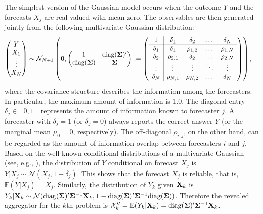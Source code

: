 \documentclass[11pt]{article}
\newcommand{\E}{\mathbb{E}}
\theoremstyle{definition}
\theoremstyle{definition}
\def\bSigma{{\bf \Sigma}}
\def\X{{\bf X}}
\def\E{{\mathbb E}}
\def\diag{\text{diag}}
\def\diag{\text{diag}}
\begin{document}
The simplest version of the Gaussian model occurs when the outcome $Y$ and the forecasts $X_j$ are real-valued with mean zero. The observables are then generated jointly from the following multivariate Gaussian distribution:
\begin{align}
\left(\begin{matrix} Y \\ X_{1}\\ \vdots \\ X_{N} \end{matrix}\right) &\sim \mathcal{N}_{N+1}\left( 
 \boldsymbol{0}, \left(\begin{matrix} 
1 & \diag(\bSigma)'\\
\diag(\bSigma) &\bSigma\\
 \end{matrix}\right) 
 :=
 \left(\begin{array}{c | c c cc }
1 & \delta_1 & \delta_2 & \dots & \delta_N  \\ \hline
\delta_1 & \delta_1 &\rho_{1,2} & \dots & \rho_{1,N}   \\ 
\delta_2 & \rho_{2,1} & \delta_2 & \dots & \rho_{2,N}  \\ 
\vdots & \vdots & \vdots & \ddots & \vdots  \\ 
\delta_N & \rho_{N,1} & \rho_{N,2} & \dots & \delta_N\\ 
 \end{array}\right)\right),  \label{NExperts}
\end{align}
where the covariance structure describes the information among the forecasters. In particular, the maximum amount of information is $1.0$. The diagonal entry $\delta_j \in [0,1]$ represents the amount of information known to forecaster $j$. A forecaster with $\delta_j = 1$ (or $\delta_j = 0$) always reports the correct answer $Y$ (or the marginal mean $\mu_0 = 0$, respectively). The off-diagonal $\rho_{i,j}$, on the other hand, can be regarded as the amount of information overlap between forecasters $i$ and $j$. Based on the well-known conditional distributions of a multivariate Gaussian (see, e.g., \citealt{ravishanker2001first}), the distribution of $Y$ conditional on forecast $X_j$ is $Y|X_j \sim \mathcal{N}(X_j, 1-\delta_j)$. This shows that the forecast $X_j$ is reliable, that is, $\E(Y | X_j) = X_j$. 
Similarly, the distribution of $Y_k$ given $\X_k$ is $Y_k | \X_k \sim \mathcal{N}(\diag(\bSigma)'\bSigma^{-1}\X_k, 1- \diag(\bSigma)'\bSigma^{-1}\diag(\bSigma))$. Therefore the revealed aggregator for the $k$th problem is $\mathcal{X}_k''  = \E(Y_k | \X_k) = \diag(\bSigma)'\bSigma^{-1}\X_k$. 
\end{document}
